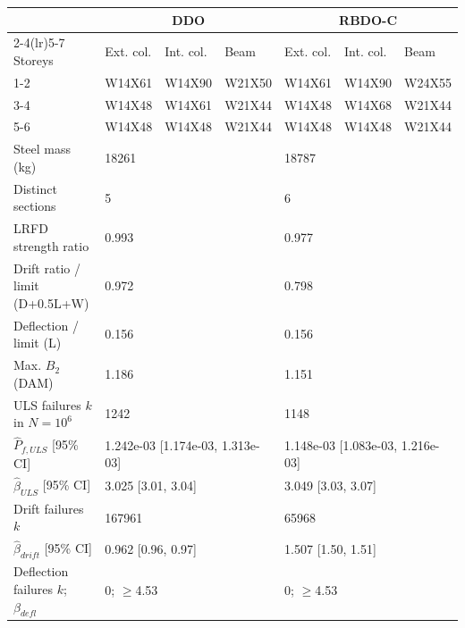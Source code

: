 \begin{tabular}{lllllll}
\toprule
 & \multicolumn{3}{c}{DDO} & \multicolumn{3}{c}{RBDO-C} \\
\cmidrule(lr){2-4}\cmidrule(lr){5-7}
Storeys & Ext. col. & Int. col. & Beam & Ext. col. & Int. col. & Beam \\
\midrule
1-2 & W14X61 & W14X90 & W21X50 & W14X61 & W14X90 & W24X55 \\
3-4 & W14X48 & W14X61 & W21X44 & W14X48 & W14X68 & W21X44 \\
5-6 & W14X48 & W14X48 & W21X44 & W14X48 & W14X48 & W21X44 \\
\midrule
Steel mass (kg) & \multicolumn{3}{l}{18261} & \multicolumn{3}{l}{18787} \\
Distinct sections & \multicolumn{3}{l}{5} & \multicolumn{3}{l}{6} \\
LRFD strength ratio & \multicolumn{3}{l}{0.993} & \multicolumn{3}{l}{0.977} \\
Drift ratio / limit (D+0.5L+W) & \multicolumn{3}{l}{0.972} & \multicolumn{3}{l}{0.798} \\
Deflection / limit (L) & \multicolumn{3}{l}{0.156} & \multicolumn{3}{l}{0.156} \\
Max. $B_2$ (DAM) & \multicolumn{3}{l}{1.186} & \multicolumn{3}{l}{1.151} \\
ULS failures $k$ in $N=10^6$ & \multicolumn{3}{l}{1242} & \multicolumn{3}{l}{1148} \\
$\hat P_{f,ULS}$ [95\% CI] & \multicolumn{3}{l}{1.242e-03 [1.174e-03, 1.313e-03]} & \multicolumn{3}{l}{1.148e-03 [1.083e-03, 1.216e-03]} \\
$\hat\beta_{ULS}$ [95\% CI] & \multicolumn{3}{l}{3.025 [3.01, 3.04]} & \multicolumn{3}{l}{3.049 [3.03, 3.07]} \\
Drift failures $k$ & \multicolumn{3}{l}{167961} & \multicolumn{3}{l}{65968} \\
$\hat\beta_{drift}$ [95\% CI] & \multicolumn{3}{l}{0.962 [0.96, 0.97]} & \multicolumn{3}{l}{1.507 [1.50, 1.51]} \\
Deflection failures $k$; $\beta_{defl}$ & \multicolumn{3}{l}{0; $\geq$4.53} & \multicolumn{3}{l}{0; $\geq$4.53} \\
\bottomrule
\end{tabular}
